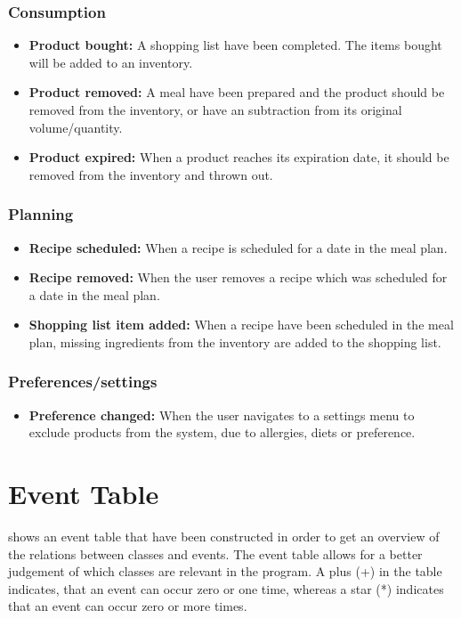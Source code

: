 \subsubsection{Consumption}
\begin{itemize}
\item \textbf{Product bought:} A shopping list have been completed. The items bought will be added to an inventory.
\item \textbf{Product removed:} A meal have been prepared and the product should be removed from the inventory, or have an subtraction from its original volume/quantity.
\item \textbf{Product expired:} When a product reaches its expiration date, it should be removed from the inventory and thrown out.
\end{itemize}

\subsubsection{Planning}
\begin{itemize}
    \item \textbf{Recipe scheduled:} When a recipe is scheduled for a date in the meal plan.
    \item \textbf{Recipe removed:} When the user removes a recipe which was scheduled for a date in the meal plan.
    \item \textbf{Shopping list item added:} When a recipe have been scheduled in the meal plan, missing ingredients from the inventory are added to the shopping list.
\end{itemize}

\subsubsection{Preferences/settings}
\begin{itemize}
\item \textbf{Preference changed:} When the user navigates to a settings menu to exclude products from the system, due to allergies, diets or preference.
\end{itemize}

\section{Event Table}
 shows an event table that have been constructed in order to get an overview of the relations between classes and events. The event table allows for a better judgement of which classes are relevant in the program. A plus (+) in the table indicates, that an event can occur zero or one time, whereas a star (*) indicates that an event can occur zero or more times.

